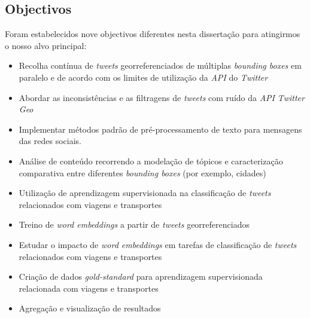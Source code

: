 \documentclass[9pt,a4paper]{extarticle}
\begin{document}
\begin{multicols}{2}
\section{Objectivos}\label{sec:goals}


Foram estabelecidos nove objectivos diferentes nesta dissertação para atingirmos o nosso alvo principal:
\begin{itemize}
	\item Recolha contínua de \emph{tweets} georreferenciados de múltiplas \emph{bounding boxes} em paralelo e de acordo com os limites de utilização da \emph{API} do \emph{Twitter}
	\item Abordar as inconsistências e as filtragens de \emph{tweets} com ruído da \emph{API} \emph{Twitter Geo}
	\item Implementar métodos padrão de pré-processamento de texto para mensagens das redes sociais.
	\item Análise de conteúdo recorrendo a modelação de tópicos e caracterização comparativa entre diferentes \emph{bounding boxes} (por exemplo, cidades)
	\item Utilização de aprendizagem supervisionada na classificação de \emph{tweets} relacionados com viagens e transportes
	\item Treino de \emph{word embeddings} a partir de \emph{tweets} georreferenciados
	\item Estudar o impacto de \emph{word embeddings} em tarefas de classificação de \emph{tweets} relacionados com viagens e transportes 
	\item Criação de dados \emph{gold-standard} para aprendizagem supervisionada relacionada com viagens e transportes
	\item Agregação e visualização de resultados
\end{itemize}


\end{multicols}
\end{document}
